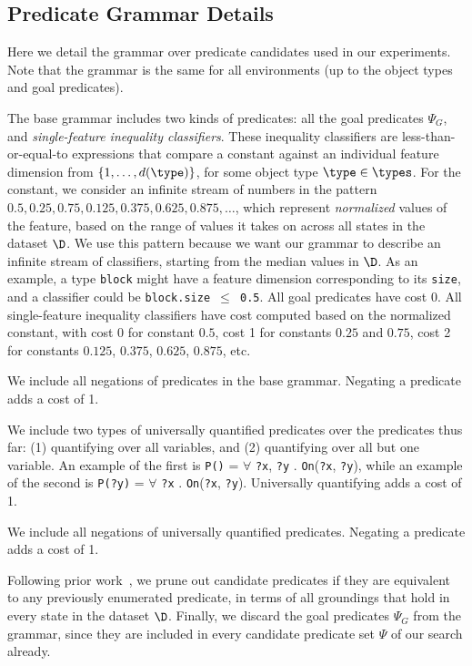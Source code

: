 \subsection{Predicate Grammar Details}
\label{app:grammar}

Here we detail the grammar over predicate candidates used in our experiments.
Note that the grammar is the same for all environments (up to the object types and goal predicates).

\begin{tightlist}
\item The base grammar includes two kinds of predicates: all the goal predicates $\Psi_G$, and \emph{single-feature inequality classifiers}. These inequality classifiers are less-than-or-equal-to expressions that compare a constant against an individual feature dimension from $\{1, \ldots, d(\type)\}$, for some object type $\type \in \types$. For the constant, we consider an infinite stream of numbers in the pattern $0.5, 0.25, 0.75, 0.125, 0.375, 0.625, 0.875, \ldots$, which represent \emph{normalized} values of the feature, based on the range of values it takes on across all states in the dataset $\D$. We use this pattern because we want our grammar to describe an infinite stream of classifiers, starting from the median values in $\D$. As an example, a type \texttt{block} might have a feature dimension corresponding to its \texttt{size}, and a classifier could be \texttt{block.size $\leq$ 0.5}. All goal predicates have cost 0. All single-feature inequality classifiers have cost computed based on the normalized constant, with cost 0 for constant $0.5$, cost 1 for constants $0.25$ and $0.75$, cost 2 for constants $0.125$, $0.375$, $0.625$, $0.875$, etc.
\item We include all negations of predicates in the base grammar. Negating a predicate adds a cost of 1.
\item We include two types of universally quantified predicates over the predicates thus far: (1) quantifying over all variables, and (2) quantifying over all but one variable. An example of the first is \texttt{P()} = $\forall$ \texttt{?x}, \texttt{?y} . \texttt{On}(\texttt{?x}, \texttt{?y}), while an example of the second is \texttt{P(?y)} = $\forall$ \texttt{?x} . \texttt{On}(\texttt{?x}, \texttt{?y}). Universally quantifying adds a cost of 1.
\item We include all negations of universally quantified predicates. Negating a predicate adds a cost of 1.
\item Following prior work~\cite{curtis2021discovering}, we prune out candidate predicates if they are equivalent to any previously enumerated predicate, in terms of all groundings that hold in every state in the dataset $\D$. Finally, we discard the goal predicates $\Psi_G$ from the grammar, since they are included in every candidate predicate set  $\Psi$ of our search already.
\end{tightlist}


